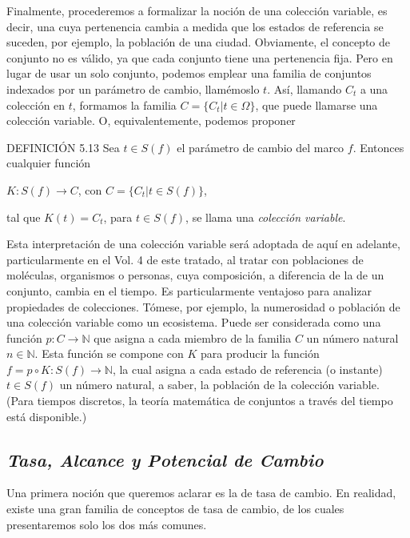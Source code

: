 \begin{justifying}
    Finalmente, procederemos a formalizar la noción de una colección variable, es decir, una cuya pertenencia 
    cambia a medida que los estados de referencia se suceden, por ejemplo, la población de una ciudad. Obviamente, 
    el concepto de conjunto no es válido, ya que cada conjunto tiene una pertenencia fija. Pero en lugar de usar un 
    solo conjunto, podemos emplear una familia de conjuntos indexados por un parámetro de cambio, llamémoslo $t$. 
    Así, llamando $C_t$ a una colección en $t$, formamos la familia $C=\{C_t | t \in \Omega\}$, que puede llamarse 
    una colección variable. O, equivalentemente, podemos proponer

    \bigskip

    \noindent DEFINICIÓN 5.13 Sea $t \in S(f)$ el parámetro de cambio del marco $f$. Entonces cualquier función
    \begin{center}
        $K: S(f) \to C$, con $C=\{C_t | t \in S(f)\}$,
    \end{center}
    tal que $K(t) = C_t$, para $t \in S(f)$, se llama una \textit{colección variable}.

    \newpage

    Esta interpretación de una colección variable será adoptada de aquí en adelante, particularmente en el Vol. 4 de 
    este tratado, al tratar con poblaciones de moléculas, organismos o personas, cuya composición, a diferencia de la 
    de un conjunto, cambia en el tiempo. Es particularmente ventajoso para analizar propiedades de colecciones. Tómese, 
    por ejemplo, la numerosidad o población de una colección variable como un ecosistema. Puede ser considerada como una
    función $p: C \to \mathbb{N}$ que asigna a cada miembro de la familia $C$ un número natural $n \in \mathbb{N}$. Esta 
    función se compone con $K$ para producir la función $f = p \circ K: S(f) \to \mathbb{N}$, la cual asigna a cada estado 
    de referencia (o instante) $t \in S(f)$ un número natural, a saber, la población de la colección variable. (Para tiempos 
    discretos, la teoría matemática de conjuntos a través del tiempo está disponible.)

    \subsection{\textit {Tasa, Alcance y Potencial de Cambio}}

    \noindent Una primera noción que queremos aclarar es la de tasa de cambio. En realidad, existe una gran familia de conceptos 
    de tasa de cambio, de los cuales presentaremos solo los dos más comunes.


\end{justifying}
